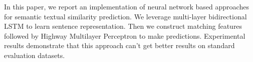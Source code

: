 In this paper, we report an implementation of neural network based approaches for semantic textual similarity prediction. We leverage multi-layer bidirectional LSTM to learn sentence representation. Then we construct matching features followed by Highway Multilayer Perceptron to make predictions. Experimental results demonstrate that this approach can't get better results on standard evaluation datasets.
